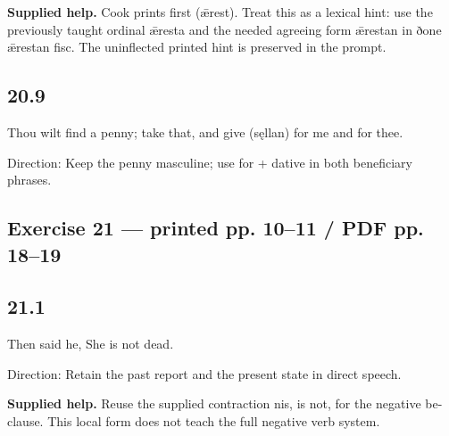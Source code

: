 \textbf{Supplied help.} Cook prints first (ǣrest). Treat this as a lexical hint: use the previously taught ordinal ǣresta and the needed agreeing form ǣrestan in ðone ǣrestan fisc. The uninflected printed hint is preserved in the prompt.

\subsection*{20.9}

\par\begin{minipage}{\linewidth}\raggedright
Thou wilt find a penny; take that, and give (sęllan) for me and for thee.

Direction: Keep the penny masculine; use for + dative in both beneficiary phrases.

\end{minipage}\par\addvspace{4pt}

\subsection*{Exercise 21 — printed pp. 10–11 /\allowbreak{} PDF pp. 18–19}

\subsection*{21.1}

\par\begin{minipage}{\linewidth}\raggedright
Then said he, She is not dead.

Direction: Retain the past report and the present state in direct speech.

\textbf{Supplied help.} Reuse the supplied contraction nis, is not, for the negative be-clause. This local form does not teach the full negative verb system.

\end{minipage}\par\addvspace{4pt}

